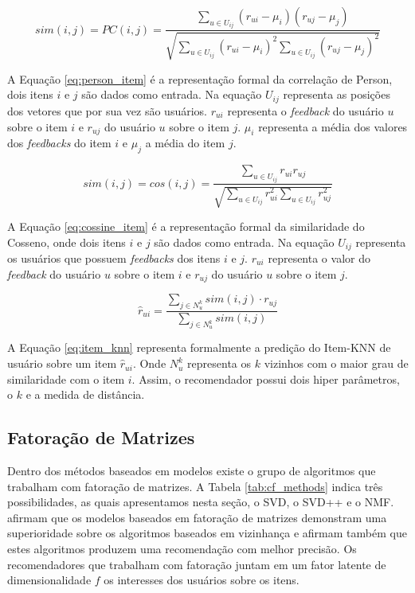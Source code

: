 \begin{equation}
    \label{eq:person_item}
    sim(i,j) = PC(i,j) = \frac{\sum_{u \in U_{ij}}(r_{ui} - \mu_i)(r_{uj} - \mu_j)}{\sqrt{\sum_{u \in U_{ij}}(r_{ui} - \mu_i)^2\sum_{u \in U_{ij}}(r_{uj} - \mu_j)^2}}
\end{equation}

A Equação \ref{eq:person_item} é a representação formal da correlação de Person, dois itens $i$ e $j$ são dados como entrada. Na equação $U_{ij}$ representa as posições dos vetores que por sua vez são usuários. $r_{ui}$ representa o \textit{feedback} do usuário $u$ sobre o item $i$ e $r_{uj}$ do usuário $u$ sobre o item $j$. $\mu_i$ representa a média dos valores dos \textit{feedbacks} do item $i$ e $\mu_j$ a média do item $j$.

\begin{equation}
    \label{eq:cossine_item}
    sim(i,j) = cos(i,j) = \frac{\sum_{u \in U_{ij}}r_{ui}r_{uj}}{\sqrt{\sum_{u \in U_{ij}}r_{ui}^2\sum_{u \in U_{ij}}r_{uj}^2}}
\end{equation}

A Equação \ref{eq:cossine_item} é a representação formal da similaridade do Cosseno, onde dois itens $i$ e $j$ são dados como entrada. Na equação $U_{ij}$ representa os usuários que possuem \textit{feedbacks} dos itens $i$ e $j$. $r_{ui}$ representa o valor do \textit{feedback} do usuário $u$ sobre o item $i$ e $r_{uj}$ do usuário $u$ sobre o item $j$.

\begin{equation}
    \label{eq:item_knn}
    \hat{r}_{ui} = \frac{\sum_{j \in N_{u}^{k}} sim(i,j)\cdot r_{uj}}{\sum_{j \in N_{u}^{k}} sim(i,j)}
\end{equation}

A Equação \ref{eq:item_knn} representa formalmente a predição do Item-KNN de usuário sobre um item $\hat{r}_{ui}$. Onde $N_{u}^{k}$ representa os $k$ vizinhos com o maior grau de similaridade com o item $i$. Assim, o recomendador possui dois hiper parâmetros, o $k$ e a medida de distância.

\subsection{Fatoração de Matrizes}
\label{sec:mf_algos}
Dentro dos métodos baseados em modelos existe o grupo de algoritmos que trabalham com fatoração de matrizes. A Tabela \ref{tab:cf_methods} indica três possibilidades, as quais apresentamos nesta seção, o \ac{SVD}, o \ac{SVD++} e o \ac{NMF}.  afirmam que os modelos baseados em fatoração de matrizes demonstram uma superioridade sobre os algoritmos baseados em vizinhança e afirmam também que estes algoritmos produzem uma recomendação com melhor precisão. Os recomendadores que trabalham com fatoração juntam em um fator latente de dimensionalidade $f$ os interesses dos usuários sobre os itens.

